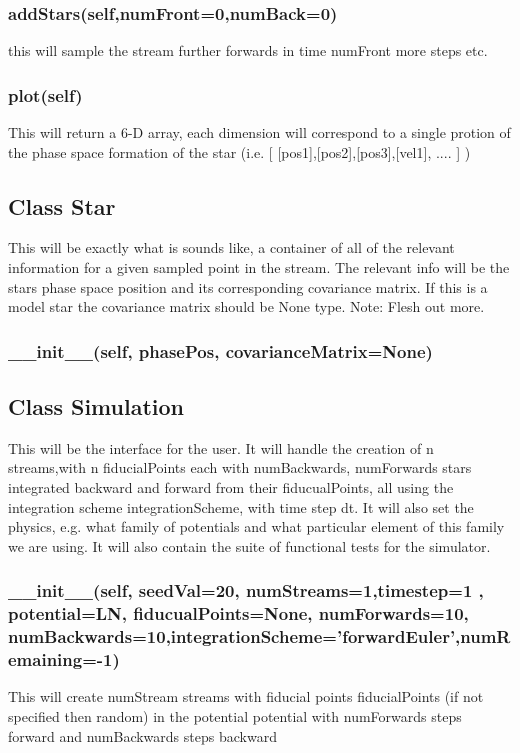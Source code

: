 \documentclass{article}
\begin{document}
\subsubsection{addStars(self,numFront=0,numBack=0)}
this will sample the stream further forwards in time numFront more steps etc. 

\subsubsection{plot(self)}
This will return a 6-D array, each dimension will correspond to a single protion of the phase space 
formation of the star (i.e. [ [pos1],[pos2],[pos3],[vel1], .... ] )




\subsection{Class Star}
This will be exactly what is sounds like, a container of all of the relevant information for a given sampled 
point in the stream. The relevant info will be the stars phase space position and its corresponding covariance matrix. If this
is a model star the covariance matrix should be None type. Note: Flesh out more.

\subsubsection{\_\_init\_\_(self, phasePos, covarianceMatrix=None)}


\subsection{Class Simulation}
This will be the interface for the user. It will handle the creation of n streams,with n fiducialPoints each with numBackwards, 
numForwards stars integrated backward and forward from their fiducualPoints, all using the integration scheme integrationScheme, with time step dt. It will also set 
the physics, e.g. what family of potentials and what particular element of this family we are using. It will also contain the suite of functional tests for the simulator.

\subsubsection{\_\_init\_\_(self, seedVal=20, numStreams=1,timestep=1 , potential=LN, fiducualPoints=None, numForwards=10, numBackwards=10,integrationScheme='forwardEuler',numRemaining=-1)}
This will create numStream streams  with fiducial points fiducialPoints (if not specified then random) in the potential potential with numForwards steps forward and numBackwards steps backward
\end{document}
